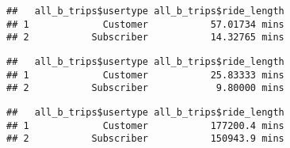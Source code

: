 \documentclass[
]{article}
\newenvironment{Shaded}{\begin{snugshade}}{\end{snugshade}}
\newcommand{\AttributeTok}[1]{\textcolor[rgb]{0.77,0.63,0.00}{#1}}
\newcommand{\CommentTok}[1]{\textcolor[rgb]{0.56,0.35,0.01}{\textit{#1}}}
\newcommand{\FunctionTok}[1]{\textcolor[rgb]{0.00,0.00,0.00}{#1}}
\newcommand{\NormalTok}[1]{#1}
\newcommand{\SpecialCharTok}[1]{\textcolor[rgb]{0.00,0.00,0.00}{#1}}
\begin{document}
\begin{Shaded}
\end{Shaded}

\begin{verbatim}
##   all_b_trips$usertype all_b_trips$ride_length
## 1             Customer           57.01734 mins
## 2           Subscriber           14.32765 mins
\end{verbatim}

\begin{Shaded}
\end{Shaded}

\begin{verbatim}
##   all_b_trips$usertype all_b_trips$ride_length
## 1             Customer           25.83333 mins
## 2           Subscriber            9.80000 mins
\end{verbatim}

\begin{Shaded}
\end{Shaded}

\begin{verbatim}
##   all_b_trips$usertype all_b_trips$ride_length
## 1             Customer           177200.4 mins
## 2           Subscriber           150943.9 mins
\end{verbatim}

\begin{Shaded}
\end{Shaded}
\end{document}
